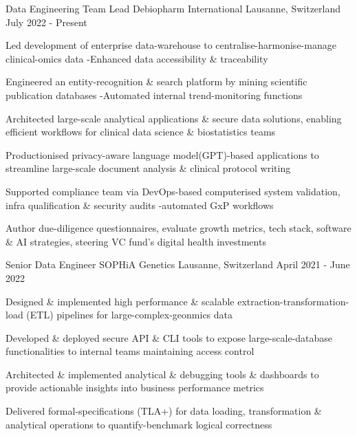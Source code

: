 

\begin{cventries}

\vspace{-0.3cm}
 \cventry
    {Data Engineering Team Lead} %
    {Debiopharm International} %
    {Lausanne, Switzerland} %
    {July 2022 - Present} %
    {
      \begin{cvitems} %
        \item {Led development of enterprise data-warehouse to centralise-harmonise-manage clinical-omics data -Enhanced data accessibility \& traceability}
        \item {Engineered an entity-recognition \& search platform by mining scientific publication databases -Automated internal trend-monitoring functions}
        \item {Architected large-scale analytical applications \& secure data solutions, enabling efficient workflows for clinical data science \& biostatistics teams}
        \item {Productionised privacy-aware language model(GPT)-based applications to streamline large-scale document analysis \& clinical protocol writing}
        \item {Supported compliance team via DevOps-based computerised system validation, infra qualification \& security audits -automated GxP workflows}
        \item {Author due-diligence questionnaires, evaluate growth metrics, tech stack, software \& AI strategies, steering VC fund's digital health investments}
      \end{cvitems}
    }

	
 \cventry
    {Senior Data Engineer} %
    {SOPHiA Genetics} %
    {Lausanne, Switzerland} %
    {April 2021 - June 2022} %
    {
      \begin{cvitems} %
        \item {Designed \& implemented high performance \& scalable extraction-transformation-load (ETL) pipelines for large-complex-geonmics data}
        \item {Developed \& deployed secure API \& CLI tools to expose large-scale-database functionalities to internal teams maintaining access control}
        \item {Architected \& implemented analytical \& debugging tools \& dashboards to provide actionable insights into business performance metrics}
        \item {Delivered formal-specifications (TLA+) for data loading, transformation \& analytical operations to quantify-benchmark logical correctness}
      \end{cvitems}
    }


\end{cventries}
